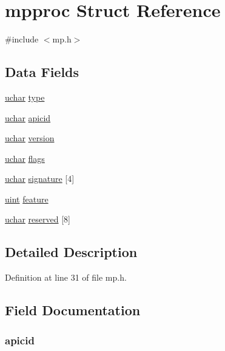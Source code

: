 \hypertarget{structmpproc}{\section{mpproc Struct Reference}
\label{structmpproc}
}


{\ttfamily \#include $<$mp.\-h$>$}

\subsection*{Data Fields}
\begin{DoxyCompactItemize}
\item 
\hyperlink{types_8h_a65f85814a8290f9797005d3b28e7e5fc}{uchar} \hyperlink{structmpproc_a7720cfa5e476235d84bbe5bb8ad56959}{type}
\item 
\hyperlink{types_8h_a65f85814a8290f9797005d3b28e7e5fc}{uchar} \hyperlink{structmpproc_a6522b1dc7ec7c8888fb39b08b723bb9b}{apicid}
\item 
\hyperlink{types_8h_a65f85814a8290f9797005d3b28e7e5fc}{uchar} \hyperlink{structmpproc_aa6ea6b1d12a723848cc34b199ddd8aef}{version}
\item 
\hyperlink{types_8h_a65f85814a8290f9797005d3b28e7e5fc}{uchar} \hyperlink{structmpproc_abe146a6a9523880d7ce48965f8d07b34}{flags}
\item 
\hyperlink{types_8h_a65f85814a8290f9797005d3b28e7e5fc}{uchar} \hyperlink{structmpproc_a086ff3269e8b74e0f05b9120d4cac23b}{signature} \mbox{[}4\mbox{]}
\item 
\hyperlink{types_8h_a91ad9478d81a7aaf2593e8d9c3d06a14}{uint} \hyperlink{structmpproc_a2336e944364e02cfce4790bb4f0939fb}{feature}
\item 
\hyperlink{types_8h_a65f85814a8290f9797005d3b28e7e5fc}{uchar} \hyperlink{structmpproc_a5ec0760e684b75fdefef7023af0a3c72}{reserved} \mbox{[}8\mbox{]}
\end{DoxyCompactItemize}


\subsection{Detailed Description}


Definition at line 31 of file mp.\-h.



\subsection{Field Documentation}
\hypertarget{structmpproc_a6522b1dc7ec7c8888fb39b08b723bb9b}{
\subsubsection[{apicid}]{ apicid}}\label{structmpproc_a6522b1dc7ec7c8888fb39b08b723bb9b}


